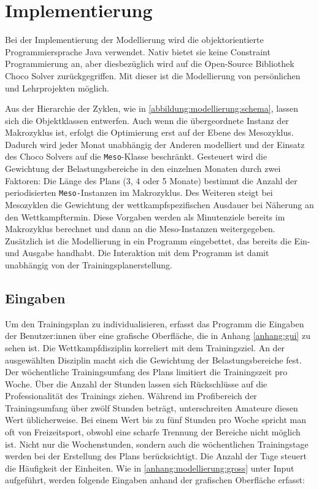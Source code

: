 \chapter{Implementierung}
\label{sec:implementierung} 
Bei der Implementierung der Modellierung wird die objektorientierte Programmiersprache Java \cite{java} verwendet. Nativ bietet sie keine Constraint Programmierung an, aber diesbezüglich wird auf die Open-Source Bibliothek Choco Solver \cite{ChocoSolverWeb} zurückgegriffen. Mit dieser ist die Modellierung von persönlichen und Lehrprojekten möglich. \par
Aus der Hierarchie der Zyklen, wie in \ref{abbildung:modellierung:schema}, lassen sich die Objektklassen entwerfen. Auch wenn die übergeordnete Instanz der Makrozyklus ist, erfolgt die Optimierung erst auf der Ebene des Mesozyklus. Dadurch wird jeder Monat unabhängig der Anderen modelliert und der Einsatz des Choco Solvers auf die \texttt{Meso}-Klasse beschränkt. Gesteuert wird die Gewichtung der Belastungsbereiche in den einzelnen Monaten durch zwei Faktoren: Die Länge des Plans (3, 4 oder 5 Monate) bestimmt die Anzahl der periodisierten \texttt{Meso-}Instanzen im Makrozyklus. Des Weiteren steigt bei Mesozyklen die Gewichtung der wettkampfspezifischen Ausdauer bei Näherung an den Wettkampftermin. Diese Vorgaben werden als Minutenziele bereits im Makrozyklus berechnet und dann an die Meso-Instanzen weitergegeben.
Zusätzlich ist die Modellierung in ein Programm eingebettet, das bereits die Ein- und Ausgabe handhabt. Die Interaktion mit dem Programm ist damit unabhängig von der Trainingsplanerstellung. \par

\section{Eingaben}
Um den Trainingsplan zu individualisieren, erfasst das Programm die Eingaben der Benutzer:innen über eine grafische Oberfläche, die in Anhang \ref{anhang:gui} zu sehen ist. Die Wettkampfdisziplin korreliert mit dem Trainingsziel. An der ausgewählten Disziplin macht sich die Gewichtung der Belastungsbereiche fest. Der wöchentliche Trainingsumfang des Plans limitiert die Trainingszeit pro Woche. Über die Anzahl der Stunden lassen sich Rückschlüsse auf die Professionalität des Trainings ziehen. Während im Profibereich der Trainingsumfang über zwölf Stunden beträgt, unterschreiten Amateure diesen Wert üblicherweise. Bei einem Wert bis zu fünf Stunden pro Woche spricht man oft von Freizeitsport, obwohl eine scharfe Trennung der Bereiche nicht möglich ist.\newline
Nicht nur die Wochenstunden, sondern auch die wöchentlichen Trainingstage werden bei der Erstellung des Plans berücksichtigt. Die Anzahl der Tage steuert die Häufigkeit der Einheiten.
Wie in \ref{anhang:modellierung:gross} unter Input aufgeführt, werden folgende Eingaben anhand der grafischen Oberfläche erfasst:

